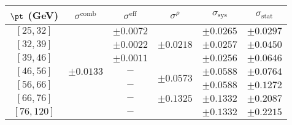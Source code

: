 \begin{tabular}{c||c|c|c||c|c}
$\pt$ (GeV) & $\sigma^{\text{comb}}$ & $\sigma^{\text{eff}}$ & $\sigma^\rho$ & $\sigma_{\text{sys}}$ & $\sigma_{\text{stat}}$ \\
\hline
$[25, 32]$ & \multirow{7}{*}{$\pm0.0133$} & $\pm0.0072$ & \multirow{3}{*}{$\pm0.0218$} & $\pm0.0265$ & $\pm0.0297$\\
$[32, 39]$ &  & $\pm0.0022$ &  & $\pm0.0257$ & $\pm0.0450$\\
$[39, 46]$ &  & $\pm0.0011$ &  & $\pm0.0256$ & $\pm0.0646$\\\cline{5-5}
$[46, 56]$ &  & $-$ & \multirow{2}{*}{$\pm0.0573$} & $\pm0.0588$ & $\pm0.0764$\\
$[56, 66]$ &  & $-$ &  & $\pm0.0588$ & $\pm0.1272$\\\cline{5-5}
$[66, 76]$ &  & $-$ & \multirow{1}{*}{$\pm0.1325$} & $\pm0.1332$ & $\pm0.2087$\\
$[76, 120]$ &  & $-$ &  & $\pm0.1332$ & $\pm0.2215$\\
\end{tabular}
